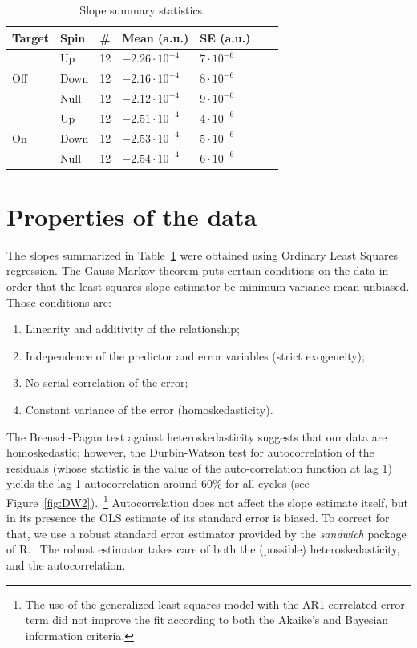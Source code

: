\documentclass{report}
\begin{document}
\newcommand{\vp}[2]{#1\cdot10^{#2}}
\begin{table}[h]
	\centering
	\caption{Slope summary statistics.\label{tbl:SlpSumStat}}
	\begin{tabular}{lllllrr}
		\hline\hline
		       Target        & Spin & \# & Mean (a.u.)      & SE (a.u.)    \\ \hline
		\multirow{3}{*}{Off} & Up   & 12 & $\vp{-2.26}{-4}$ & $\vp{7}{-6}$ \\
		                     & Down & 12 & $\vp{-2.16}{-4}$ & $\vp{8}{-6}$ \\
		                     & Null & 12 & $\vp{-2.12}{-4}$ & $\vp{9}{-6}$ \\ \hline
		\multirow{3}{*}{On}  & Up   & 12 & $\vp{-2.51}{-4}$ & $\vp{4}{-6}$ \\
		                     & Down & 12 & $\vp{-2.53}{-4}$ & $\vp{5}{-6}$ \\
		                     & Null & 12 & $\vp{-2.54}{-4}$ & $\vp{6}{-6}$ \\ \hline
	\end{tabular}
\end{table}


\section{Properties of the data}
The slopes summarized in Table~\ref{tbl:SlpSumStat} were obtained using Ordinary Least Squares regression. 
The Gauss-Markov theorem puts certain conditions on the data in order that the least squares slope estimator be minimum-variance mean-unbiased. Those conditions are:~\cite{GaussMarkov}
\begin{enumerate}
	\item Linearity and additivity of the relationship;
	\item Independence of the predictor and error variables (strict exogeneity);
	\item No serial correlation of the error;
	\item Constant variance of the error (homoskedasticity).
\end{enumerate}

The Breusch-Pagan test against heteroskedasticity suggests that our data are homoskedastic; however, the Durbin-Watson test for autocorrelation of the residuals (whose statistic is the value of the auto-correlation function at lag 1) yields the lag-1 autocorrelation around 60\% for all cycles (see Figure~\ref{fig:DW2}).~\footnote{The use of the generalized least squares model with the AR1-correlated error term did not improve the fit according to both the Akaike's and Bayesian information criteria.} Autocorrelation does not affect the slope estimate itself, but in its presence the OLS estimate of its standard error is biased. To correct for that, we use a robust standard error estimator provided by the \emph{sandwich} package of R.~\cite{RSandwich} The robust estimator takes care of both the (possible) heteroskedasticity, and the autocorrelation. 
\end{document}
